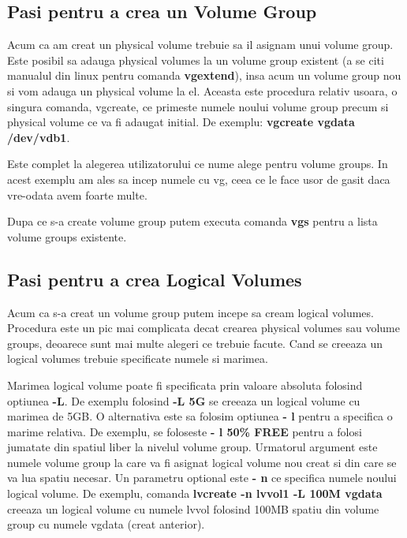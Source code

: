 \subsection{Pasi pentru a crea un Volume Group}
Acum ca am creat un physical volume trebuie sa il asignam unui volume group. Este posibil sa adauga physical volumes la un volume group existent (a se citi manualul din linux pentru comanda \textbf{vgextend}), insa acum un volume group nou si vom adauga un physical volume la el. Aceasta este procedura relativ usoara, o singura comanda, vgcreate, ce primeste numele noului volume group precum si physical volume ce va fi adaugat initial. De exemplu: \textbf{vgcreate vgdata /dev/vdb1}.
\par Este complet la alegerea utilizatorului ce nume alege pentru volume groups. In acest exemplu am ales sa incep numele cu vg, ceea ce le face usor de gasit daca vre-odata avem foarte multe. 
\par Dupa ce s-a create volume group putem executa comanda \textbf{vgs} pentru a lista volume groups existente.
\subsection{Pasi pentru a crea Logical Volumes}
Acum ca s-a creat un volume group putem incepe sa cream logical volumes. Procedura este un pic mai complicata decat crearea physical volumes sau volume groups, deoarece sunt mai multe alegeri ce trebuie facute. Cand se creeaza un logical volumes trebuie specificate numele si marimea.
\par
Marimea logical volume poate fi specificata prin valoare absoluta folosind optiunea \textbf{-L}. De exemplu folosind \textbf{-L 5G} se creeaza un logical volume cu marimea de 5GB. O alternativa este sa folosim optiunea \textbf{- l} pentru a specifica o marime relativa. De exemplu, se foloseste \textbf{- l 50\% FREE} pentru a folosi jumatate din spatiul liber la nivelul volume group. Urmatorul argument este numele volume group la care va fi asignat logical volume nou creat si din care se va lua spatiu necesar. Un parametru optional este \textbf{- n} ce specifica numele noului logical volume. De exemplu, comanda \textbf{lvcreate -n lvvol1 -L 100M vgdata} creeaza un logical volume cu numele lvvol folosind 100MB spatiu din volume group cu numele vgdata (creat anterior).
